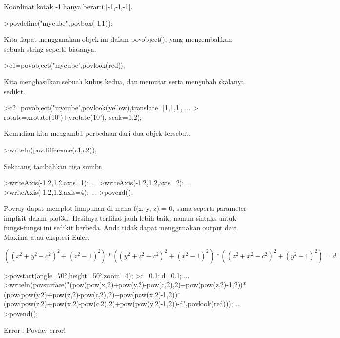 \documentclass[a4paper,10pt]{article}
\begin{document}
\begin{eulernotebook}
\begin{eulercomment}
\begin{eulercomment}
\begin{eulercomment}
Koordinat kotak -1 hanya berarti [-1,-1,-1].
\end{eulercomment}
\begin{eulerprompt}
>povdefine("mycube",povbox(-1,1));
\end{eulerprompt}
\begin{eulercomment}
Kita dapat menggunakan objek ini dalam povobject(), yang mengembalikan
sebuah string seperti biasanya.
\end{eulercomment}
\begin{eulerprompt}
>c1=povobject("mycube",povlook(red));
\end{eulerprompt}
\begin{eulercomment}
Kita menghasilkan sebuah kubus kedua, dan memutar serta mengubah
skalanya sedikit.
\end{eulercomment}
\begin{eulerprompt}
>c2=povobject("mycube",povlook(yellow),translate=[1,1,1], ...
>  rotate=xrotate(10°)+yrotate(10°), scale=1.2);
\end{eulerprompt}
\begin{eulercomment}
Kemudian kita mengambil perbedaan dari dua objek tersebut.
\end{eulercomment}
\begin{eulerprompt}
>writeln(povdifference(c1,c2));
\end{eulerprompt}
\begin{eulercomment}
Sekarang tambahkan tiga sumbu.
\end{eulercomment}
\begin{eulerprompt}
>writeAxis(-1.2,1.2,axis=1); ...
>writeAxis(-1.2,1.2,axis=2); ...
>writeAxis(-1.2,1.2,axis=4); ...
>povend();
\end{eulerprompt}
\begin{eulercomment}
Povray dapat memplot himpunan di mana f(x, y, z) = 0, sama seperti
parameter implisit dalam plot3d. Hasilnya terlihat jauh lebih baik,
namun sintaks untuk fungsi-fungsi ini sedikit berbeda. Anda tidak
dapat menggunakan output dari Maxima atau ekspresi Euler.

\end{eulercomment}
\begin{eulerformula}
\[
((x^2+y^2-c^2)^2+(z^2-1)^2)*((y^2+z^2-c^2)^2+(x^2-1)^2)*((z^2+x^2-c^2)^2+(y^2-1)^2)=d
\]
\end{eulerformula}
\begin{eulerprompt}
>povstart(angle=70°,height=50°,zoom=4);
>c=0.1; d=0.1; ...
>writeln(povsurface("(pow(pow(x,2)+pow(y,2)-pow(c,2),2)+pow(pow(z,2)-1,2))*(pow(pow(y,2)+pow(z,2)-pow(c,2),2)+pow(pow(x,2)-1,2))*(pow(pow(z,2)+pow(x,2)-pow(c,2),2)+pow(pow(y,2)-1,2))-d",povlook(red))); ...
>povend();
\end{eulerprompt}
\begin{euleroutput}
  Error : Povray error!
  

\end{euleroutput}
\end{eulercomment}
\end{eulercomment}
\end{eulernotebook}
\end{document}
